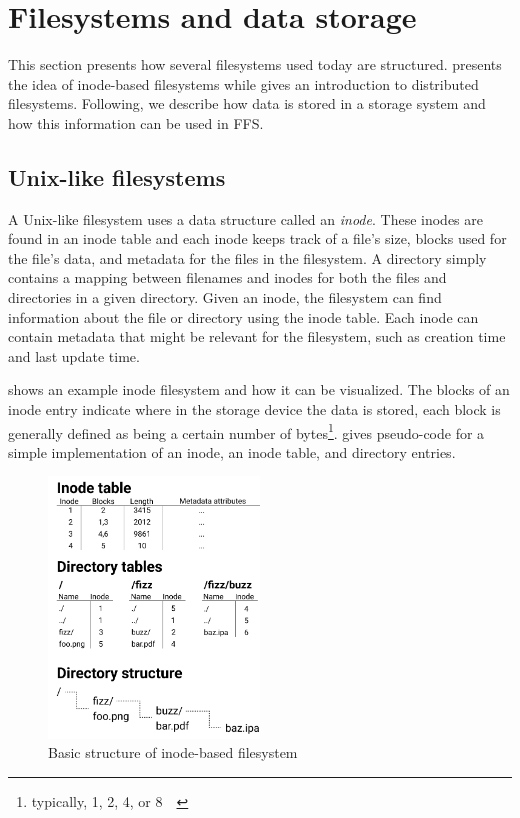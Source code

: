 \section{Filesystems and data storage}
This section presents how several filesystems used today are structured.  presents the idea of \mbox{inode-based} filesystems while  gives an introduction to distributed filesystems. Following, we describe how data is stored in a storage system and how this information can be used in \gls{FFS}.

\subsection{\mbox{Unix-like} filesystems}
\label{sec:inodeFSintroduction}
A \mbox{Unix-like} filesystem uses a data structure called an \textit{inode}. These inodes are found in an inode table and each inode keeps track of a file's size, blocks used for the file's data, and metadata for the files in the filesystem. A directory simply contains a mapping between filenames and inodes for both the files and directories in a given directory. Given an inode, the filesystem can find information about the file or directory using the inode table. Each inode can contain metadata that might be relevant for the filesystem, such as creation time and last update time. 

 shows an example inode filesystem and how it can be visualized. The blocks of an inode entry indicate where in the storage device the data is stored, each block is generally defined as being a certain number of bytes\footnote{typically, 1, 2, 4, or \SI{8}{\kibi\byte}}.  gives pseudo-code for a simple implementation of an inode, an inode table, and directory entries. 

\begin{figure}[!ht]
	\begin{center}
	  \includegraphics[width=0.5\textwidth]{figures.nosync/inode_diagram.png}
	\end{center}
	\caption{Basic structure of \mbox{inode-based} filesystem}
	\label{fig:inode_diag}
\end{figure}


